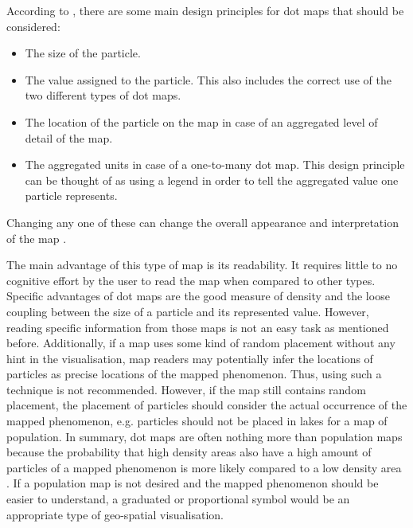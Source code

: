 According to \citeauthor{Tyner2010}, there are some main design principles for dot maps that should be considered:
\begin{itemize}
\item The size of the particle.
\item The value assigned to the particle. This also includes the correct use of the two different types of dot maps.
\item The location of the particle on the map in case of an aggregated level of detail of the map.
\item The aggregated units in case of a one-to-many dot map. This design principle can be thought of as using a legend in order to tell the aggregated value one particle represents.
\end{itemize}
Changing any one of these can change the overall appearance and interpretation of the map .

The main advantage of this type of map is its readability. It requires little to no cognitive effort by the user to read the map when compared to other types. Specific advantages of dot maps are the good measure of density and the loose coupling between the size of a particle and its represented value.
However, reading specific information from those maps is not an easy task as mentioned before. Additionally, if a map uses some kind of random placement without any hint in the visualisation, map readers may potentially infer the locations of particles as precise locations of the mapped phenomenon. Thus, using such a technique is not recommended. However, if the map still contains random placement, the placement of particles should consider the actual occurrence of the mapped phenomenon, e.g. particles should not be placed in lakes for a map of population.
In summary, dot maps are often nothing more than population maps because the probability that high density areas also have a high amount of particles of a mapped phenomenon is more likely compared to a low density area . If a population map is not desired and the mapped phenomenon should be easier to understand, a graduated or proportional symbol would be an appropriate type of geo-spatial visualisation.